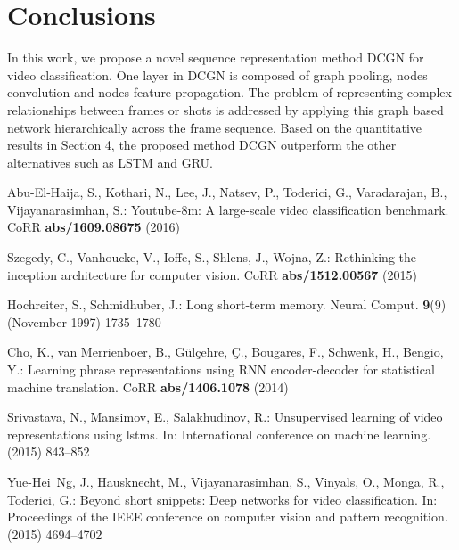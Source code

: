 \documentclass[runningheads]{llncs}
\begin{document}
\section{Conclusions}

In this work, we propose a novel sequence representation method DCGN for video classification. One layer in DCGN is composed of graph pooling, nodes convolution and nodes feature propagation. The problem of representing complex relationships between frames or shots is addressed by applying this graph based network hierarchically across the frame sequence. Based on the quantitative results in Section 4, the proposed method DCGN outperform the other alternatives such as LSTM and GRU. 


\begin{thebibliography}{10}

Abu{-}El{-}Haija, S., Kothari, N., Lee, J., Natsev, P., Toderici, G.,
  Varadarajan, B., Vijayanarasimhan, S.:
\newblock Youtube-8m: {A} large-scale video classification benchmark.
\newblock CoRR \textbf{abs/1609.08675} (2016)

Szegedy, C., Vanhoucke, V., Ioffe, S., Shlens, J., Wojna, Z.:
\newblock Rethinking the inception architecture for computer vision.
\newblock CoRR \textbf{abs/1512.00567} (2015)

Hochreiter, S., Schmidhuber, J.:
\newblock Long short-term memory.
\newblock Neural Comput. \textbf{9}(9) (November 1997)  1735--1780

Cho, K., van Merrienboer, B., G{\"{u}}l{\c{c}}ehre, {\c{C}}., Bougares, F.,
  Schwenk, H., Bengio, Y.:
\newblock Learning phrase representations using {RNN} encoder-decoder for
  statistical machine translation.
\newblock CoRR \textbf{abs/1406.1078} (2014)

Srivastava, N., Mansimov, E., Salakhudinov, R.:
\newblock Unsupervised learning of video representations using lstms.
\newblock In: International conference on machine learning. (2015)  843--852

Yue-Hei~Ng, J., Hausknecht, M., Vijayanarasimhan, S., Vinyals, O., Monga, R.,
  Toderici, G.:
\newblock Beyond short snippets: Deep networks for video classification.
\newblock In: Proceedings of the IEEE conference on computer vision and pattern
  recognition. (2015)  4694--4702


\end{thebibliography}
\end{document}
